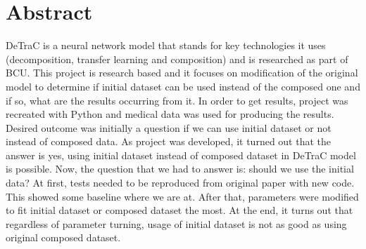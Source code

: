 \section*{Abstract}
DeTraC is a neural network model that stands for key technologies it uses (decomposition, transfer learning and composition) and is researched as part of BCU. 
\newline
This project is research based and it focuses on modification of the original model to determine if initial dataset can be used instead of the composed one and if so, what are the results occurring from it.
\newline
In order to get results, project was recreated with Python and medical data was used for producing the results. 
\newline
Desired outcome was initially a question if we can use initial dataset or not instead of composed data. As project was developed, it turned out that the answer is yes, using initial dataset instead of composed dataset in DeTraC model is possible. Now, the question that we had to answer is: should we use the initial data? 
\newline
At first, tests needed to be reproduced from original paper with new code. This showed some baseline where we are at. After that, parameters were modified to fit initial dataset or composed dataset the most. At the end, it turns out that regardless of parameter turning, usage of initial dataset is not as good as using original composed dataset.
\newpage
